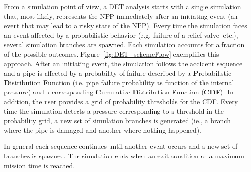 From a simulation point of view, a DET analysis starts with a single simulation that, most likely, represents the NPP immediately after an initiating event (an event that may lead to a risky state of the NPP). Every time the simulation faces an event affected by a probabilistic behavior (e.g. failure of a relief valve, etc.), several simulation branches are spawned. Each simulation accounts for a fraction of the possible outcomes.
Figure~\ref{fig:DET_schemeFlow} exemplifies this approach. After an initiating event, the simulation follows the accident sequence and a pipe is affected by a probability of failure described by a \textbf{P}robabilistic \textbf{D}istribution \textbf{F}unction (i.e. pipe failure probability as function of the internal pressure) and a corresponding \textbf{C}umulative \textbf{D}istribution \textbf{F}unction (\textbf{CDF}). 
In addition, the user provides a grid of probability thresholds for the CDF. Every time the simulation detects a pressure corresponding to a threshold in the probability grid, a new set of simulation branches is generated (ie., a branch  where the pipe is damaged  and another where nothing happened).

In general each sequence continues until another event occurs and a new set of branches is spawned. The simulation ends when an exit condition or a maximum mission time is reached.
